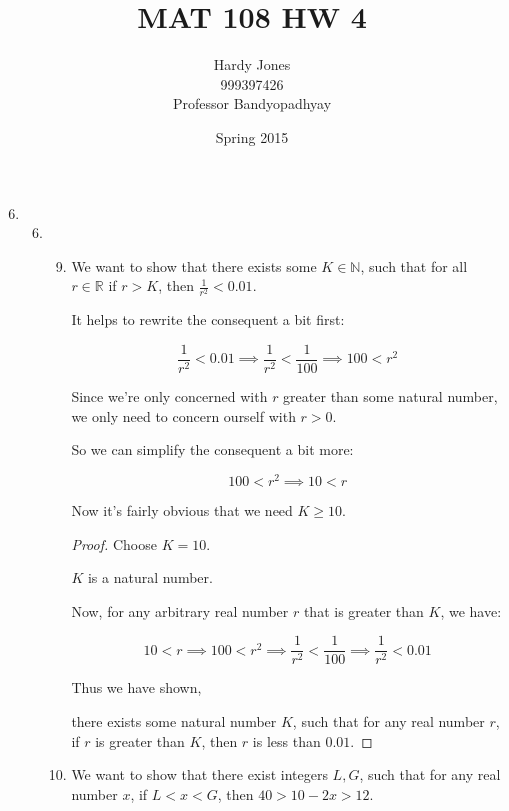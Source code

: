 \documentclass[12pt,letterpaper]{article}
\title{MAT 108 HW 4\vspace{-2ex}}
\author{Hardy Jones\\
        999397426\\
        Professor Bandyopadhyay\vspace{-2ex}}
\date{Spring 2015}
\begin{document}
  \maketitle

  \begin{enumerate}
    \setcounter{enumi}{5}
    \item
      \begin{enumerate}
        \setcounter{enumii}{5}
        \item
          \begin{enumerate}
            \setcounter{enumiii}{8}
            \item
              We want to show that there exists some $K \in \mathbb{N}$,
              such that for all $r \in \mathbb{R}$ if $r > K$, then $\frac{1}{r^2} < 0.01$.

              It helps to rewrite the consequent a bit first:

              \[
                \frac{1}{r^2} < 0.01 \implies \frac{1}{r^2} < \frac{1}{100} \implies 100 < r^2
              \]

              Since we're only concerned with $r$ greater than some natural number,
              we only need to concern ourself with $r > 0$.

              So we can simplify the consequent a bit more:

              \[
                100 < r^2 \implies 10 < r
              \]

              Now it's fairly obvious that we need $K \geq 10$.

              \begin{proof}
                Choose $K = 10$.

                $K$ is a natural number.

                Now, for any arbitrary real number $r$ that is greater than $K$,
                we have:

                \[
                  10 < r \implies 100 < r^2 \implies \frac{1}{r^2} < \frac{1}{100} \implies \frac{1}{r^2} < 0.01
                \]

                Thus we have shown,

                there exists some natural number $K$,
                such that for any real number $r$,
                if $r$ is greater than $K$, then $r$ is less than $0.01$.
              \end{proof}
            \item
              We want to show that there exist integers $L, G$,
              such that for any real number $x$,
              if $L < x < G$, then $40 > 10 - 2x > 12$.


\end{enumerate}
\end{enumerate}
\end{enumerate}
\end{document}
